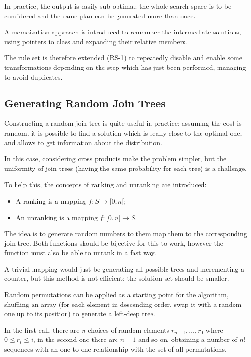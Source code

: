 In practice, the output is easily sub-optimal: the whole search space is to be considered and the same plan can be generated more than once. 

A memoization approach is introduced to remember the intermediate solutions, using pointers to class and expanding their relative members.

The rule set is therefore extended (RS-1) to repeatedly disable and enable some transformations depending on the step which has just been performed, managing to avoid duplicates. 

\subsection{Generating Random Join Trees}
Constructing a random join tree is quite useful in practice: assuming the cost is random, it is possible to find a solution which is really close to the optimal one, and allows to get information about the distribution.

In this case, considering cross products make the problem simpler, but the uniformity of join trees (having the same probability for each tree) is a challenge.

To help this, the concepts of ranking and unranking are introduced:
\begin{itemize}
	\item A ranking is a mapping $f : S \rightarrow [0, n[$;
	\item An unranking is a mapping $f : [0, n[ \rightarrow S$.
\end{itemize}
The idea is to generate random numbers to them map them to the corresponding join tree. Both functions should be bijective for this to work, however the function must also be able to unrank in a fast way.

A trivial mapping would just be generating all possible trees and incrementing a counter, but this method is not efficient: the solution set should be smaller.

Random permutations can be applied as a starting point for the algorithm, shuffling an array (for each element in descending order, swap it with a random one up to its position) to generate a left-deep tree. 

In the first call, there are $n$ choices of random elements $r_{n-1}, \dots, r_0$ where $0 \leq r_i \leq i$, in the second one there are $n - 1$ and so on, obtaining a number of $n!$ sequences with an one-to-one relationship with the set of all permutations.

